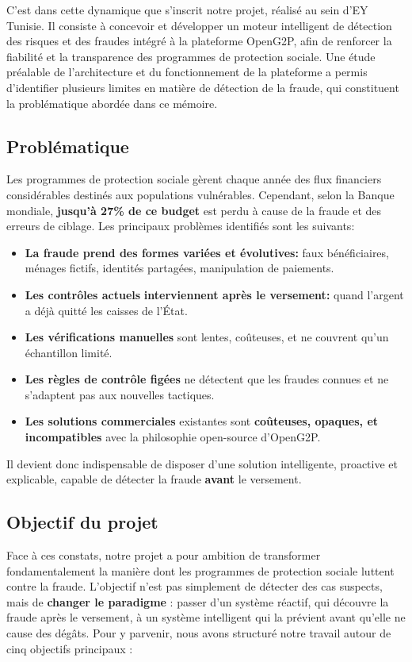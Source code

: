 \documentclass[a4paper, oneside, 12pt]{book}
\begin{document}
\hspace{0.5cm}C'est dans cette dynamique que s'inscrit notre projet, réalisé au sein d'EY Tunisie. Il consiste à concevoir et développer un moteur intelligent de détection des risques et des fraudes intégré à la plateforme OpenG2P, afin de renforcer la fiabilité et la transparence des programmes de protection sociale. Une étude préalable de l'architecture et du fonctionnement de la plateforme a permis d'identifier plusieurs limites en matière de détection de la fraude, qui constituent la problématique abordée dans ce mémoire.

\subsection{Problématique}
\hspace{0.5cm}Les programmes de protection sociale gèrent chaque année des flux financiers considérables destinés aux populations vulnérables. Cependant, selon la Banque mondiale, \textbf{jusqu'à 27\% de ce budget} est perdu à cause de la fraude et des erreurs de ciblage\cite{BM_Sourcebook2020}. Les principaux problèmes identifiés sont les suivants:

\begin{itemize}
    \item \textbf{La fraude prend des formes variées et évolutives:} faux bénéficiaires, ménages fictifs, identités partagées, manipulation de paiements.
    \item \textbf{Les contrôles actuels} \textbf{interviennent après le versement:} quand l'argent a déjà quitté les caisses de l'État.
    \item \textbf{Les vérifications manuelles} sont lentes, coûteuses, et ne couvrent qu'un échantillon limité.
    \item \textbf{Les règles de contrôle figées} ne détectent que les fraudes connues et ne s'adaptent pas aux nouvelles tactiques.
    \item \textbf{Les solutions commerciales} existantes sont \textbf{coûteuses, opaques, et incompatibles} avec la philosophie open-source d'OpenG2P.
\end{itemize}


\hspace{0.5cm}Il devient donc indispensable de disposer d'une solution intelligente, proactive et explicable, capable de détecter la fraude \textbf{avant} le versement.

\subsection{Objectif du projet}
\hspace{0.5cm}Face à ces constats, notre projet a pour ambition de transformer fondamentalement la manière dont les programmes de protection sociale luttent contre la fraude. L'objectif n'est pas simplement de détecter des cas suspects, mais de \textbf{changer le paradigme} : passer d'un système réactif, qui découvre la fraude après le versement, à un système intelligent qui la prévient avant qu'elle ne cause des dégâts. Pour y parvenir, nous avons structuré notre travail autour de cinq objectifs principaux :
\end{document}
